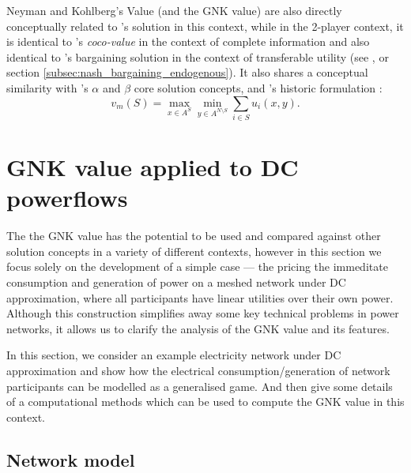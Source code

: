 Neyman and Kohlberg's Value (and the GNK value) are also directly conceptually related to \cite{values3}'s solution in this context,
while in the 2-player context, it is identical to \cite{kalai1,Kalai2010}'s \textit{coco-value} in the context of complete information  
and also identical to \cite{nash2}'s bargaining solution in the context of transferable utility (see \cite{value2}, or section \ref{subsec:nash_bargaining_endogenous}).
It also shares a conceptual similarity with \cite{aumann1961core}'s $\alpha$ and $\beta$ core solution concepts, and \cite{1944}'s historic formulation :
\begin{equation}\label{knvalue3}v_m(S) = \max_{x\in A^S}\min_{y\in A^{N\setminus S}} \sum_{i\in S} u_i(x,y).\end{equation}


\section{GNK value applied to DC powerflows}\label{more_involved}

The the GNK value has the potential to be used and compared against other solution concepts in a variety of different contexts,
however in this section we focus solely on the development of a simple case --- the pricing the immeditate consumption and generation of power on a meshed network under DC approximation, where all participants have linear utilities over their own power.
Although this construction simplifies away some key technical problems in power networks, it allows us to clarify the analysis of the GNK value and its features.

In this section, we consider an example electricity network under DC approximation and show how the electrical consumption/generation of network participants can be modelled as a generalised game. And then give some details of a computational methods which can be used to compute the GNK value in this context.

\subsection{Network model}\label{sec:the_setup}


